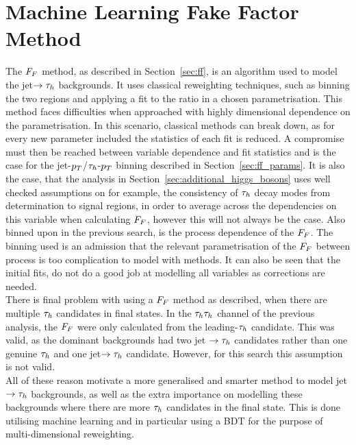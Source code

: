 \section{Machine Learning Fake Factor Method}
\label{sec:ml_ff}

The $F_{F}$ method, as described in Section~\ref{sec:ff}, is an algorithm used to model the jet$\rightarrow \tau_{h}$ backgrounds.
It uses classical reweighting techniques, such as binning the two regions and applying a fit to the ratio in a chosen parametrisation.
This method faces difficulties when approached with highly dimensional dependence on the parametrisation.
In this scenario, classical  methods can break down, as for every new parameter included the statistics of each fit is reduced.
A compromise must then be reached between variable dependence and fit statistics and is the case for the jet-$p_{T}$/$\tau_{h}$-$p_{T}$ binning described in Section~\ref{sec:ff_params}.
It is also the case, that the analysis in Section~\ref{sec:additional_higgs_bosons} uses well checked assumptions on for example, the consistency of $\tau_{h}$ decay modes from determination to signal regions, in order to average across the dependencies on this variable when calculating $F_{F}$, however this will not always be the case.
Also binned upon in the previous search, is the process dependence of the $F_{F}$.
The binning used is an admission that the relevant parametrisation of the $F_{F}$ between process is too complication to model with  methods.
It can also be seen that the initial fits, do not do a good job at modelling all variables as corrections are needed. \\

There is final problem with using a $F_{F}$ method as described, when there are multiple $\tau_{h}$ candidates in final states. 
In the $\tau_{h}\tau_{h}$ channel of the previous analysis, the $F_{F}$ were only calculated from the leading-$\tau_{h}$ candidate.
This was valid, as the dominant backgrounds had two jet $\rightarrow\tau_{h}$ candidates rather than one genuine $\tau_{h}$ and one jet$\rightarrow\tau_{h}$ candidate.
However, for this search this assumption is not valid. \\

All of these reason motivate a more generalised and smarter method to model jet $\rightarrow\tau_{h}$ backgrounds, as well as the extra importance on modelling these backgrounds where there are more $\tau_{h}$ candidates in the final state.
This is done utilising machine learning and in particular using a BDT for the purpose of multi-dimensional reweighting. \\ 

